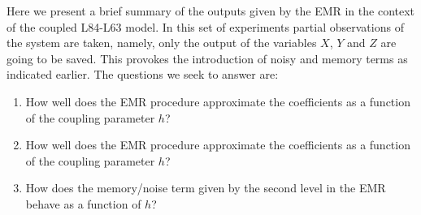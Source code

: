 \documentclass[12pt]{article}
\begin{document}
Here we present a brief summary of the  outputs given by the EMR in the context of the coupled L84-L63 model. In this set of experiments partial observations of the system are taken, namely, only the output of the variables $X$, $Y$ and $Z$ are going to be saved. This provokes the introduction of noisy and memory terms as indicated earlier. The questions we seek to answer are:

\begin{enumerate}
	\item How well does the EMR procedure approximate the coefficients as a function of the coupling parameter $h$?
	\item How well does the EMR procedure approximate the coefficients as a function of the coupling parameter $h$?
	\item How does the memory/noise term given by the second level in the EMR behave as a function of $h$?
\end{enumerate}
\end{document}
